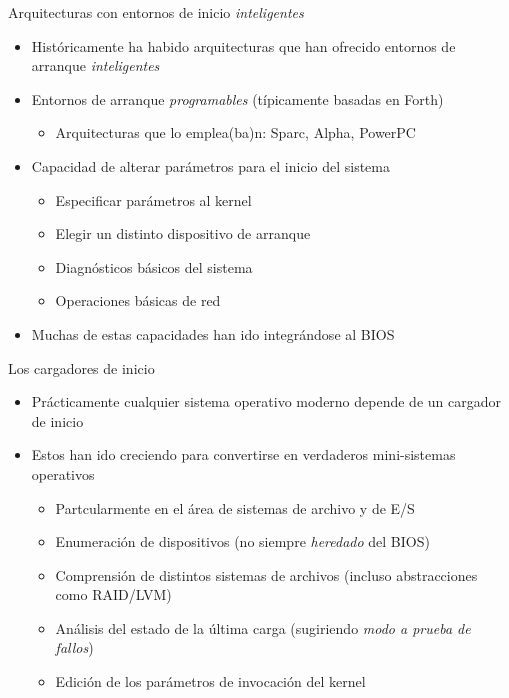\documentclass[presentation]{beamer}
\begin{document}
\begin{frame}[label={sec:orgb4f314a}]{Arquitecturas con entornos de inicio \emph{inteligentes}}
\begin{itemize}
\item Históricamente ha habido arquitecturas que han ofrecido entornos de
arranque \emph{inteligentes}
\item Entornos de arranque \emph{programables} (típicamente basadas en Forth)
\begin{itemize}
\item Arquitecturas que lo emplea(ba)n: Sparc, Alpha, PowerPC
\end{itemize}
\item Capacidad de alterar parámetros para el inicio del sistema
\begin{itemize}
\item Especificar parámetros al kernel
\item Elegir un distinto dispositivo de arranque
\item Diagnósticos básicos del sistema
\item Operaciones básicas de red
\end{itemize}
\item Muchas de estas capacidades han ido integrándose al BIOS
\end{itemize}
\end{frame}

\begin{frame}[label={sec:org7062943}]{Los cargadores de inicio}
\begin{itemize}
\item Prácticamente cualquier sistema operativo moderno depende de un
cargador de inicio
\item Estos han ido creciendo para convertirse en verdaderos
mini-sistemas operativos
\begin{itemize}
\item Partcularmente en el área de sistemas de archivo y de E/S
\item Enumeración de dispositivos (no siempre \emph{heredado} del BIOS)
\item Comprensión de distintos sistemas de archivos (incluso
abstracciones como RAID/LVM)
\item Análisis del estado de la última carga (sugiriendo \emph{modo a prueba
de fallos})
\item Edición de los parámetros de invocación del kernel
\end{itemize}
\end{itemize}
\end{frame}
\end{document}
